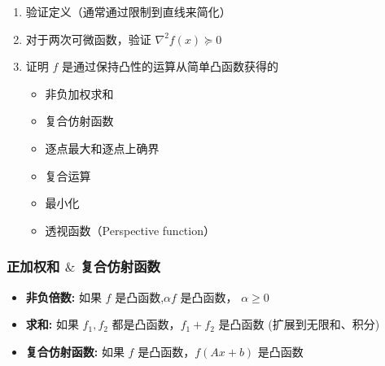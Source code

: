 \documentclass[handout,10pt]{beamer}
\begin{document}
\begin{frame}
\mytitle{\secno \secname}

	

\begin{enumerate}
  \item 验证定义（通常通过限制到直线来简化）\\
\item 对于两次可微函数，验证 $\nabla^{2} f(x) \succeq 0$\\
\item 证明 $f$ 是通过保持凸性的运算从简单凸函数获得的\\

    \begin{itemize}
    	\item 非负加权求和
    	\item 复合仿射函数
    	\item 逐点最大和逐点上确界
    	\item 复合运算
    	\item 最小化
    	\item 透视函数（Perspective function）
    \end{itemize}
\end{enumerate}

\end{frame}
\begin{frame}
	\frametitle{正加权和 $\&$ 复合仿射函数}

\begin{itemize}
  \item \textbf{非负倍数:} 如果 $f$ 是凸函数,$\alpha f$ 是凸函数， $\alpha \geq 0$\\

	\item \textbf{求和:} 如果 $f_{1}, f_{2}$ 都是凸函数，$f_{1}+f_{2}$ 是凸函数 (扩展到无限和、积分)\\
	
\item	\textbf{复合仿射函数:}  如果 $f$ 是凸函数，$f(A x+b)$ 是凸函数\\
	
\end{itemize}
	
\end{frame}
\end{document}
